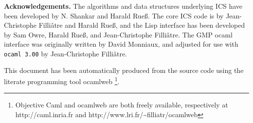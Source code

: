 \documentclass[12pt]{article}
\begin{document}
\vspace{10mm}
{\bf Acknowledgements.}
The algorithms and data structures underlying ICS have been
developed by N. Shankar and Harald Rue{\ss}\@. The core ICS code is
by Jean-Christophe Filli{\^a}tre and Harald Rue{\ss}, and the Lisp
interface has been developed by Sam Owre, Harald Rue{\ss}, and
Jean-Christophe Filli{\^a}tre. The GMP ocaml interface was originally
written by David Monniaux, and adjusted for use with \texttt{ocaml 3.00} by
Jean-Christophe Filli{\^a}tre.

 This document has been automatically produced
from the source code using the literate programming tool \textsf{ocamlweb}%
\footnote{\textsf{Objective Caml} and
  \textsf{ocamlweb} are both freely available, respectively at
  \textsf{http://caml.inria.fr} and
  \textsf{http://www.lri.fr/\~{}filliatr/ocamlweb}}.




\end{document}
